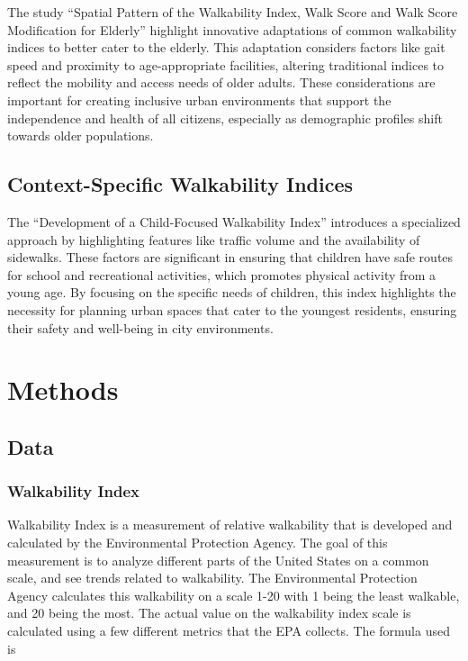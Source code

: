 \documentclass[
]{article}
\begin{document}
The study ``Spatial Pattern of the Walkability Index, Walk Score and
Walk Score Modification for Elderly'' highlight innovative adaptations
of common walkability indices to better cater to the elderly. This
adaptation considers factors like gait speed and proximity to
age-appropriate facilities, altering traditional indices to reflect the
mobility and access needs of older adults. These considerations are
important for creating inclusive urban environments that support the
independence and health of all citizens, especially as demographic
profiles shift towards older populations.

\subsection{Context-Specific Walkability
Indices}\label{context-specific-walkability-indices}

The ``Development of a Child-Focused Walkability Index'' introduces a
specialized approach by highlighting features like traffic volume and
the availability of sidewalks. These factors are significant in ensuring
that children have safe routes for school and recreational activities,
which promotes physical activity from a young age. By focusing on the
specific needs of children, this index highlights the necessity for
planning urban spaces that cater to the youngest residents, ensuring
their safety and well-being in city environments.

\section{Methods}\label{methods}

\subsection{Data}\label{data}

\subsubsection{Walkability Index}\label{walkability-index}

Walkability Index is a measurement of relative walkability that is
developed and calculated by the Environmental Protection Agency. The
goal of this measurement is to analyze different parts of the United
States on a common scale, and see trends related to walkability. The
Environmental Protection Agency calculates this walkability on a scale
1-20 with 1 being the least walkable, and 20 being the most. The actual
value on the walkability index scale is calculated using a few different
metrics that the EPA collects. The formula used is
\end{document}
